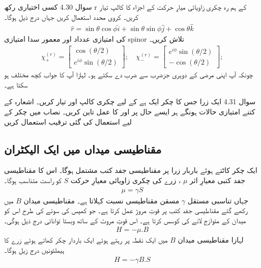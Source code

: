 سوال 
4.30
کسی اختیاری رکھ r کے ہم رہ چکری زاویائی میارِ حرکت کے اجزاء کا کالپ 
تیار کریں۔ کروی محدد استعمال کریں جہاں درج ذیل ہوگا۔
\begin{align}
\hat{r} = \sin\theta \cos\phi \hat{i} + \sin\theta \sin\phi \hat{j} + \cos\theta \hat{k}
\end{align}
کی امتیازی عدداد اور معمور سدا امتیازی spinor
تلاش کریں۔
\begin{align}
\chi_{+}^{(r)} = \begin{bmatrix} \cos(\theta/2)\\ e^{i\phi}\sin(\theta/2)\end{bmatrix};
\quad
\chi_{-}^{(r)} = \begin{bmatrix} e^{i\phi}\sin(\theta/2)\\ -\cos(\theta/2)\end{bmatrix};
\end{align}
چونکہ آپ اپنی مرضی کے دوہری جزضرب 
سے ضرب دے سکتے ہو۔ لہازا آپ کا جواب کچھ مختلف ہو سکتا ہے۔ 

سوال 
4.31
ایک زرا جس کا چکر ایک ہے کے لیے چکری کالپ 
اور
تیار کریں۔ اشعارہ 
کے کتنے امتیازی حالات ہونگے ہر ایسے حال پر 
اور
کا عمل تاین کریں۔ نصاب میں 
چکر کے لیے استعمال کی گئی ترقیب استعمال کریں

\subsection{ مقناطیسی میداں میں ایک الیکٹران }
ایک چکر کاٹتے ہوئے باربار زرا پر مقناطیسی جفد کتب مشتمل ہوگا۔ اس کا مقناطیسی جفد کتبی معیارِ اثر $\mu$ ، زرے کی چکری زاویائی معیارِ حرکت $S$ کو راست متناسب ہوگا۔
\begin{align}
\mu = \gamma S
\end{align}
جہاں تناسبی مستقل $\gamma$ مسقن مقناطیسی نسبت کہلاتا ہے۔ مقناطیسی میدان $B$ میں رکھے گئے مقناطیسی جفد کتب پر قوتِ مروڑ
عمل کرتا ہے۔ جو کمپس کی سوئے کی طرح اس کو میدان کے متوازج لانے کی کوسس کرتا ہے۔ اس قوتِ مروٹ کے ساتھ وبستا توانائی درج ذیل ہوگی۔
\begin{align}
H = -\mu . B
\end{align}
لہازا مقناطیسی میدان $B$ میں ایک نقطہ پر رہتے ہوئے ایک باردار چکر کھاتے ہوئے زرے کا ہیملٹونیں درج زیل ہوگا۔
\begin{align}
H = -\gamma B.S
\end{align}

